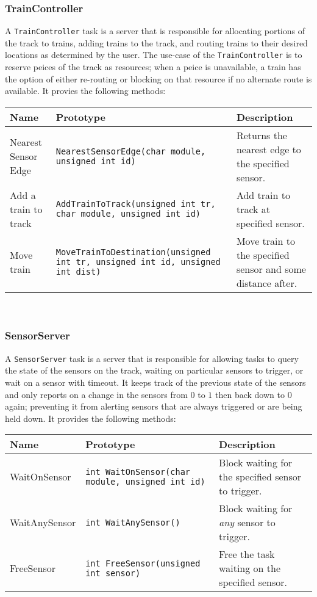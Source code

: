 \documentclass[12pt]{article}
\begin{document}
\subsubsection{TrainController}
A {\tt TrainController} task is a server that is responsible for allocating portions of the track to trains, adding trains to the track, and routing trains to their desired locations as determined by the user.  The use-case of the {\tt TrainController} is to reserve peices of the track as resources; when a peice is unavailable, a train has the option of either re-routing or blocking on that resource if no alternate route is available.  It provies the following methods:
\begin{center}
  \begin{tabular}{|l|l|p{}}
    \hline
    {\bf Name} & {\bf Prototype} & {\bf Description} \\\hline
    Nearest Sensor Edge & {\tt NearestSensorEdge(char module, unsigned int id)} & Returns the nearest edge to the specified sensor. \\\hline
    Add a train to track & {\tt AddTrainToTrack(unsigned int tr, char module, unsigned int id)} & Add train to track at specified sensor. \\\hline
    Move train & {\tt MoveTrainToDestination(unsigned int tr, unsigned int id, unsigned int dist)} & Move train to the specified sensor and some distance after. \\\hline
  \end{tabular}
\end{center}
\\
\subsubsection{SensorServer}
A {\tt SensorServer} task is a server that is responsible for allowing tasks to query the state of the sensors on the track, waiting on particular sensors to trigger, or wait on a sensor with timeout.  It keeps track of the previous state of the sensors and only reports on a change in the sensors from $0$ to $1$ then back down to $0$ again; preventing it from alerting sensors that are always triggered or are being held down.  It provides the following methods:
\begin{center}
  \begin{tabular}{|l|l|p{}}
    \hline
    {\bf Name} & {\bf Prototype} & {\bf Description} \\\hline
    WaitOnSensor & {\tt int WaitOnSensor(char module, unsigned int id)} & Block waiting for the specified sensor to trigger. \\\hline
    WaitAnySensor & {\tt int WaitAnySensor()} & Block waiting for {\it any} sensor to trigger. \\\hline
    FreeSensor & {\tt int FreeSensor(unsigned int sensor)} & Free the task waiting on the specified sensor. \\\hline
  \end{tabular}
\end{center}
\\
\end{document}
